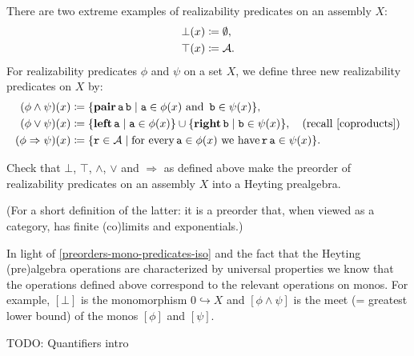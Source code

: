 \begin{definition}
  There are two extreme examples of realizability predicates on an assembly \(X\):
  \begin{align*}
    \bot(x) &\coloneqq \emptyset, \\
    \top(x) &\coloneqq \AA.
  \end{align*}
  For realizability predicates \(\phi\) and \(\psi\) on a set \(X\), we define
  three new realizability predicates on \(X\) by:
  \begin{align*}
    (\phi \land \psi)(x) &\coloneqq \set{\pcapair\pca{a}\pca{b} \mid
      \pca{a} \in \phi(x) \text{ and } \pca{b} \in \psi(x)}, \\
    (\phi \lor \psi)(x) &\coloneqq
    \set{\pcaleft\pca{a} \mid \pca{a} \in \phi(x)} \cup
    \set{\pcaright\pca{b} \mid \pca{b} \in \psi(x)},
                          \quad(\text{recall~\cref{coproducts}}) \\
    (\phi \Rightarrow \psi)(x) &\coloneqq
    \set{\pca{r} \in \AA \mid \text{for every}
    \pca{a} \in \phi(x) \text{ we have} \pca{r}\pca{a} \in \psi(x)}.
  \end{align*}
\end{definition}

\begin{exercise}\label{exer:predicates-heyting-prealgebra}
  Check that \(\bot\), \(\top\), \(\land\), \(\lor\) and \(\Rightarrow\) as
  defined above make the preorder of realizability predicates on an assembly
  \(X\) into a Heyting prealgebra.

  (For a short definition of the latter: it is a preorder that, when viewed as a
  category, has finite (co)limits and exponentials.)
\end{exercise}

In light of \cref{preorders-mono-predicates-iso} and the fact that the Heyting
(pre)algebra operations are characterized by universal properties we know that
the operations defined above correspond to the relevant operations on monos. For
example, \([\bot]\) is the monomorphism \(0 \hookrightarrow X\) and
\([\phi\land\psi]\) is the meet (= greatest lower bound) of the monos \([\phi]\)
and \([\psi]\).

\textcolor{Mulberry}{TODO: Quantifiers intro}

